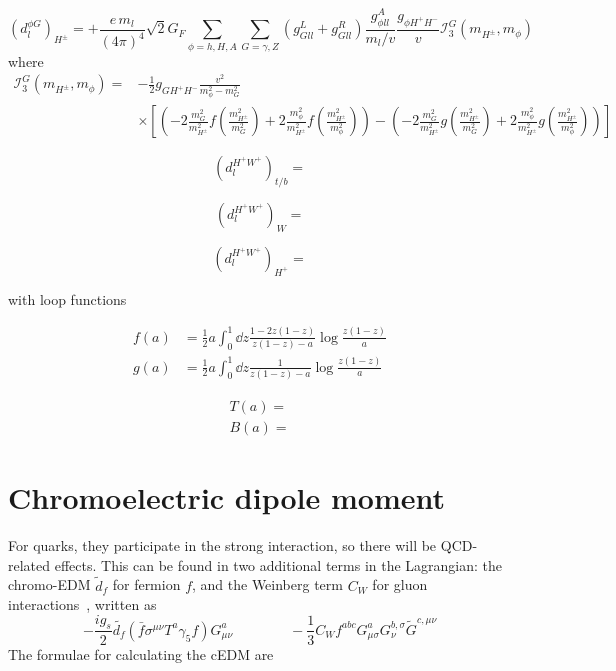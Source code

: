 \begin{equation}\label{eq:BarrZee-phiG-cHloop}
	(d^{\phi G}_{l})_{H^{\pm}} = +\frac{e\,m_{l}}{(4\pi)^{4}}\sqrt{2}G_{F}\sum_{\phi=h,H,A}\sum_{G=\gamma,Z}(g_{Gll}^{L}+g_{Gll}^{R})\frac{g_{\phi ll}^{A}}{m_{l}/v}\frac{g_{\phi H^{+}H^{-}}}{v}\mathcal{I}_{3}^{G}(m_{H^{\pm}}, m_{\phi})
\end{equation}
where
\begin{align}
	\mathcal{I}_{3}^{G}(m_{H^{\pm}}, m_{\phi}) =& -\frac{1}{2}g_{GH^{+}H^{-}}\frac{v^{2}}{m_{\phi}^{2}-m_{G}^{2}} \nonumber \\
	& \times \left[\left(-2\frac{m_{G}^{2}}{m_{H^{\pm}}^{2}} f\left(\frac{m_{H^{\pm}}^{2}}{m_{G}^{2}}\right) + 2\frac{m_{\phi}^{2}}{m_{H^{\pm}}^{2}} f\left(\frac{m_{H^{\pm}}^{2}}{m_{\phi}^{2}}\right)\right)
	-\left(-2\frac{m_{G}^{2}}{m_{H^{\pm}}^{2}} g\left(\frac{m_{H^{\pm}}^{2}}{m_{G}^{2}}\right) + 2\frac{m_{\phi}^{2}}{m_{H^{\pm}}^{2}} g\left(\frac{m_{H^{\pm}}^{2}}{m_{\phi}^{2}}\right)\right)\right]
\end{align}

\begin{equation}\label{eq:BarrZee-cHW-tbloop}
	(d^{H^{+}W^{+}}_{l})_{t/b} = 
\end{equation}

\begin{equation}\label{eq:BarrZee-cHW-Wloop}
	(d^{H^{+}W^{+}}_{l})_{W} = 
\end{equation}

\begin{equation}\label{eq:BarrZee-cHW-cHloop}
	(d^{H^{+}W^{+}}_{l})_{H^{+}} = 
\end{equation}

with loop functions

\begin{align}
	f(a) &= \frac{1}{2} a \int_{0}^{1}\dd{z}\frac{1-2z(1-z)}{z(1-z)-a}\log{\frac{z(1-z)}{a}} \nonumber \\
	g(a) &= \frac{1}{2} a \int_{0}^{1}\dd{z}\frac{1}{z(1-z)-a}\log{\frac{z(1-z)}{a}}
\end{align}

\begin{align}
	T(a)= \nonumber \\
	B(a)=
\end{align}

\section{Chromoelectric dipole moment}
For quarks, they participate in the strong interaction, so there will be QCD-related effects.
This can be found in two additional terms in the Lagrangian: 
the chromo-EDM \(\tilde{d}_{f} \) for fermion \(f \), and the Weinberg term \(C_{W} \) for gluon interactions~\cite{Weinberg89}, written as
\begin{equation}
  -\frac{i g_{s}}{2}\tilde{d_{f}}\left(\bar{f}\sigma^{\mu\nu}T^{a}\gamma_{5}f\right)G^{a}_{\mu\nu}\quad \qquad \quad -\frac{1}{3}C_Wf^{abc}G^{a}_{\mu\sigma}G^{b,\sigma}_{\nu}\tilde{G}^{c,\mu\nu}
\end{equation}
The formulae for calculating the cEDM are

